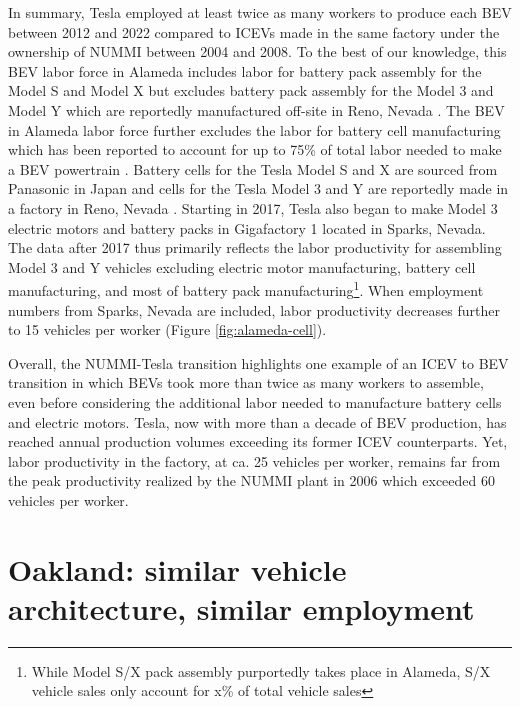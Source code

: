 \documentclass[sn-mathphys,Numbered]{sn-jnl}%
\begin{document}
In summary, Tesla employed at least twice as many workers to produce each BEV between 2012 and 2022 compared to ICEVs made in the same factory under the ownership of NUMMI between 2004 and 2008. To the best of our knowledge, this BEV labor force in Alameda includes labor for battery pack assembly for the Model S and Model X \cite{Cohen2014-tx} but excludes battery pack assembly for the Model 3 and Model Y which are reportedly manufactured off-site in Reno, Nevada \cite{Field2019-dw, Hawley2023-ek, Kane2022-cp, The_Tesla_Team2017-cp, Korosec2017-kd}. The BEV in Alameda labor force further excludes the labor for battery cell manufacturing which has been reported to account for up to 75\% of total labor needed to make a BEV powertrain \cite{Cotterman2022-jt}. Battery cells for the Tesla Model S and X are sourced from Panasonic in Japan \cite{The_Tesla_Team2011-ua} and cells for the Tesla Model 3 and Y are reportedly made in a factory in Reno, Nevada \cite{Field2019-dw, Hawley2023-ek, Kane2022-cp, The_Tesla_Team2017-cp}. Starting in 2017, Tesla also began to make Model 3 electric motors \cite{Lambert2016-ds, Korosec2017-kd} and battery packs in Gigafactory 1 located in Sparks, Nevada. The data after 2017 thus primarily reflects the labor productivity for assembling Model 3 and Y vehicles excluding electric motor manufacturing, battery cell manufacturing, and most of battery pack manufacturing\footnote{While Model S/X pack assembly purportedly takes place in Alameda, S/X vehicle sales only account for x\% of total vehicle sales}. When employment numbers from Sparks, Nevada are included, labor productivity decreases further to 15 vehicles per worker (Figure \ref{fig:alameda-cell}).

Overall, the NUMMI-Tesla transition highlights one example of an ICEV to BEV transition in which BEVs took more than twice as many workers to assemble, even before considering the additional labor needed to manufacture battery cells and electric motors. Tesla, now with more than a decade of BEV production, has reached annual production volumes exceeding its former ICEV counterparts. Yet, labor productivity in the factory, at ca. 25 vehicles per worker, remains far from the peak productivity realized by the NUMMI plant in 2006 which exceeded 60 vehicles per worker.


\section{Oakland: similar vehicle architecture, similar employment}
\end{document}
